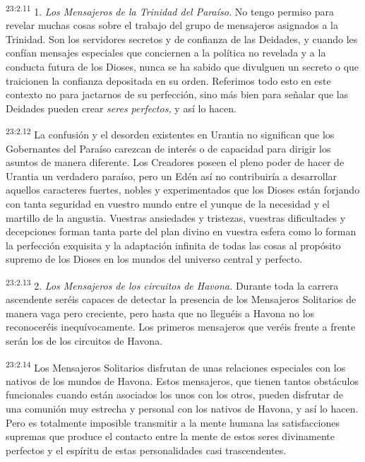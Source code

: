\par
\textsuperscript{23:2.11} 1. \textit{Los Mensajeros de la Trinidad del Paraíso.} No tengo permiso para revelar muchas cosas sobre el trabajo del grupo de mensajeros asignados a la Trinidad. Son los servidores secretos y de confianza de las Deidades, y cuando les confían mensajes especiales que conciernen a la política no revelada y a la conducta futura de los Dioses, nunca se ha sabido que divulguen un secreto o que traicionen la confianza depositada en su orden. Referimos todo esto en este contexto no para jactarnos de su perfección, sino más bien para señalar que las Deidades pueden crear \textit{seres perfectos,} y así lo hacen.

\par
\textsuperscript{23:2.12} La confusión y el desorden existentes en Urantia no significan que los Gobernantes del Paraíso carezcan de interés o de capacidad para dirigir los asuntos de manera diferente. Los Creadores poseen el pleno poder de hacer de Urantia un verdadero paraíso, pero un Edén así no contribuiría a desarrollar aquellos caracteres fuertes, nobles y experimentados que los Dioses están forjando con tanta seguridad en vuestro mundo entre el yunque de la necesidad y el martillo de la angustia. Vuestras ansiedades y tristezas, vuestras dificultades y decepciones forman tanta parte del plan divino en vuestra esfera como lo forman la perfección exquisita y la adaptación infinita de todas las cosas al propósito supremo de los Dioses en los mundos del universo central y perfecto.

\par
\textsuperscript{23:2.13} 2. \textit{Los Mensajeros de los circuitos de Havona.} Durante toda la carrera ascendente seréis capaces de detectar la presencia de los Mensajeros Solitarios de manera vaga pero creciente, pero hasta que no lleguéis a Havona no los reconoceréis inequívocamente. Los primeros mensajeros que veréis frente a frente serán los de los circuitos de Havona.

\par
\textsuperscript{23:2.14} Los Mensajeros Solitarios disfrutan de unas relaciones especiales con los nativos de los mundos de Havona. Estos mensajeros, que tienen tantos obstáculos funcionales cuando están asociados los unos con los otros, pueden disfrutar de una comunión muy estrecha y personal con los nativos de Havona, y así lo hacen. Pero es totalmente imposible transmitir a la mente humana las satisfacciones supremas que produce el contacto entre la mente de estos seres divinamente perfectos y el espíritu de estas personalidades casi trascendentes.

